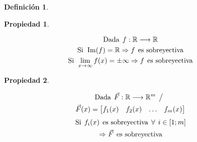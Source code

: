 \documentclass[a5paper,12pt,twoside]{book}
\newtheorem{defn}{{Definición}}[chapter]
\newtheorem{prop}{{Propiedad}}[chapter]
\begin{document}
\begin{mdframed}[style=DefinitionFrame]
    \begin{defn}
    \end{defn}
\end{mdframed}

\begin{mdframed}[style=PropertyFrame]
    \begin{prop}
    \end{prop}
    \begin{gather*}
        \textrm{Dada} \hspace{1ex} f: \mathbb{R} \longrightarrow \mathbb{R}
        \\
        \textrm{Si} \hspace{1ex} \operatorname{Im}(f) = \mathbb{R}
        \Rightarrow f \hspace{1ex} \textrm{es sobreyectiva}
        \\
        \textrm{Si} \hspace{1ex} \lim_{x \to \infty} f(x) = \pm \infty
        \Rightarrow f \hspace{1ex} \textrm{es sobreyectiva}
    \end{gather*}
\end{mdframed}

\begin{mdframed}[style=PropertyFrame]
    \begin{prop}
    \end{prop}
    \begin{multline*}
        \textrm{Dada} \hspace{1ex} \Vec{F}: \mathbb{R} \longrightarrow \mathbb{R}^m \hspace{1ex} \big/ \hspace{1ex}
        \\
        \Vec{F}(x) = \begin{bmatrix} f_1(x) & f_2(x) & \ldots & f_m(x) \end{bmatrix}
    \end{multline*}
    \begin{gather*}
        \textrm{Si} \hspace{1ex} f_i(x) \hspace{1ex} \textrm{es sobreyectiva} \hspace{1ex} \forall \hspace{1ex} i \in [1;m]
        \\
        \Rightarrow \Vec{F} \hspace{1ex} \textrm{es sobreyectiva}
    \end{gather*}
\end{mdframed}
\end{document}
